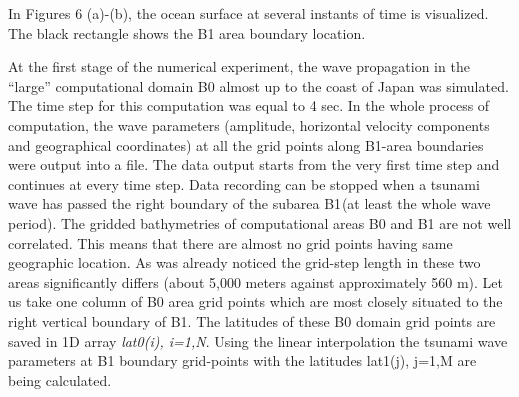 \documentclass{aip-cp}
\begin{document}
In Figures 6 (a)-(b), the ocean surface at several instants of time is visualized. 
The black rectangle shows the B1 area boundary location. 

At the first stage of the numerical experiment, the wave propagation in the 
``large'' computational domain B0 almost up to the coast of Japan was 
simulated. The time step for this computation was equal to 4 sec. In the 
whole process of computation, the wave parameters (amplitude, horizontal 
velocity components and geographical coordinates) at all the grid points 
along B1-area boundaries were output into a file. The data output starts 
from the very first time step and continues at every time step. Data 
recording can be stopped when a tsunami wave has passed the right boundary 
of the subarea B1$_{ }$(at least the whole wave period). The gridded 
bathymetries of computational areas B0 and B1 are not well correlated. This 
means that there are almost no grid points having same geographic location. 
As was already noticed the grid-step length in these two areas significantly 
differs (about 5,000 meters against approximately 560 m). Let us take one 
column of B0 area grid points which are most closely situated to the right 
vertical boundary of B1. The latitudes of these B0 domain grid points are 
saved in 1D array \textit{lat0(i), i=1,N}. Using the linear interpolation the tsunami wave 
parameters at B1 boundary grid-points with the latitudes lat1(j), j=1,M are 
being calculated.
\end{document}
